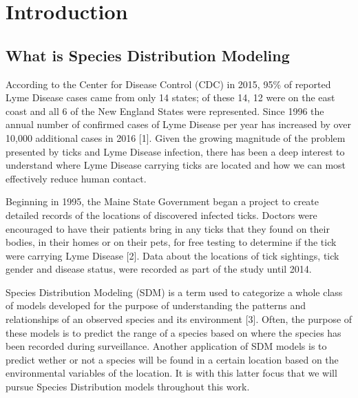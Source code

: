 
\chapter{Introduction} %

\label{Chapter1} %


\newcommand{\keyword}[1]{\textbf{#1}}
\newcommand{\tabhead}[1]{\textbf{#1}}
\newcommand{\code}[1]{\texttt{#1}}
\newcommand{\file}[1]{\texttt{\bfseries#1}}
\newcommand{\option}[1]{\texttt{\itshape#1}}


\section{What is Species Distribution Modeling}
According to the Center for Disease Control (CDC) in 2015, 95\% of reported Lyme Disease cases came from only 14 states; of these 14, 12 were on the east coast and all 6 of the New England States were represented. Since 1996 the annual number of confirmed cases of Lyme Disease per year has increased by over 10,000 additional cases in 2016 [1]. Given the growing magnitude of the problem presented by ticks and Lyme Disease infection, there has been a deep interest to understand where Lyme Disease carrying ticks are located and how we can most effectively reduce human contact. \newline

\noindent Beginning in 1995, the Maine State Government began a project to create detailed records of the locations of discovered infected ticks. Doctors were encouraged to have their patients bring in any ticks that they found on their bodies, in their homes or on their pets, for free testing to determine if the tick were carrying Lyme Disease [2]. Data about the locations of tick sightings, tick gender and disease status, were recorded as part of the study until 2014. \newline

\noindent Species Distribution Modeling (SDM) is a term used to categorize a whole class of models developed for the purpose of understanding the patterns and relationships of an observed species and its environment [3]. Often, the purpose of these models is to predict the range of a species based on where the species has been recorded during surveillance. Another application of SDM models is to predict wether or not a species will be found in a certain location based on the environmental variables of the location. It is with this latter focus that we will pursue Species Distribution models throughout this work.   \newline

